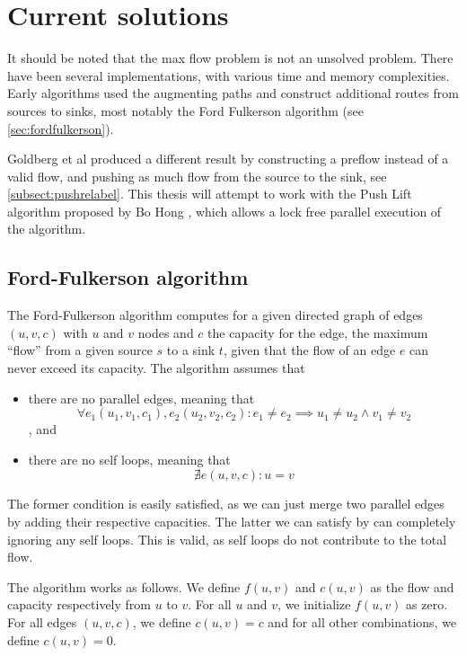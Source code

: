 \section{Current solutions}

It should be noted that the max flow problem is not an unsolved problem. There have been several implementations, with various time and memory complexities. Early algorithms used the augmenting paths\cite{LockFreeMultithreadedMaxFlow} and construct additional routes from sources to sinks, most notably the Ford Fulkerson algorithm (see  \autoref{sec:fordfulkerson}).

Goldberg et al produced a different result by constructing a preflow instead of a valid flow\cite{ANewApproachToTheMaxFlowProblem}, and pushing as much flow from the source to the sink, see \autoref{subsect:pushrelabel}. This thesis will attempt to work with the Push Lift algorithm proposed by Bo Hong \cite{LockFreeMultithreadedMaxFlow}, which allows a lock free parallel execution of the algorithm.

\subsection{Ford-Fulkerson algorithm}
\label{sec:fordfulkerson}

The Ford-Fulkerson algorithm computes for a given directed graph of edges $(u, v, c)$ with $u$ and $v$ nodes and $c$ the capacity for the edge, the maximum ``flow'' from a given source $s$ to a sink $t$, given that the flow of an edge $e$ can never exceed its capacity. The algorithm assumes that

\begin{itemize}
\item there are no parallel edges, meaning that
$$
\forall e_1 (u_1, v_1, c_1), e_2(u_2, v_2, c_2): e_1 \neq e_2 \implies u_1 \neq u_2 \land v_1 \neq v_2
$$, and
\item there are no self loops, meaning that
$$
\nexists e (u, v, c): u = v
$$
\end{itemize}

The former condition is easily satisfied, as we can just merge two parallel edges by adding their respective capacities. The latter we can satisfy by can completely ignoring any self loops. This is valid, as self loops do not contribute to the total flow.

The algorithm works as follows. We define $f(u,v)$ and $c(u, v)$ as the flow and capacity respectively from $u$ to $v$. For all $u$ and $v$, we initialize $f(u, v)$ as zero. For all edges $(u, v, c)$, we define $c(u, v) = c$ and for all other combinations, we define $c(u, v) = 0$.


